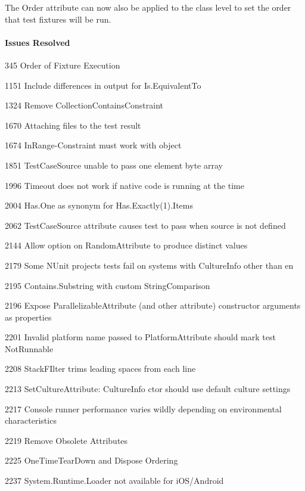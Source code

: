 The Order attribute can now also be applied to the class level to set the order that test fixtures will be run.

\paragraph*{Issues Resolved}


\begin{DoxyItemize}
\item 345 Order of Fixture Execution
\item 1151 Include differences in output for Is.\+Equivalent\+To
\item 1324 Remove Collection\+Contains\+Constraint
\item 1670 Attaching files to the test result
\item 1674 In\+Range-\/\+Constraint must work with object
\item 1851 Test\+Case\+Source unable to pass one element byte array
\item 1996 Timeout does not work if native code is running at the time
\item 2004 Has.\+One as synonym for Has.\+Exactly(1).Items
\item 2062 Test\+Case\+Source attribute causes test to pass when source is not defined
\item 2144 Allow option on Random\+Attribute to produce distinct values
\item 2179 Some N\+Unit project\textquotesingle{}s tests fail on systems with Culture\+Info other than en
\item 2195 Contains.\+Substring with custom String\+Comparison
\item 2196 Expose Parallelizable\+Attribute (and other attribute) constructor arguments as properties
\item 2201 Invalid platform name passed to Platform\+Attribute should mark test Not\+Runnable
\item 2208 Stack\+F\+Ilter trims leading spaces from each line
\item 2213 Set\+Culture\+Attribute\+: Culture\+Info ctor should use default culture settings
\item 2217 Console runner performance varies wildly depending on environmental characteristics
\item 2219 Remove Obsolete Attributes
\item 2225 One\+Time\+Tear\+Down and Dispose Ordering
\item 2237 System.\+Runtime.\+Loader not available for i\+O\+S/\+Android

\end{DoxyItemize}
